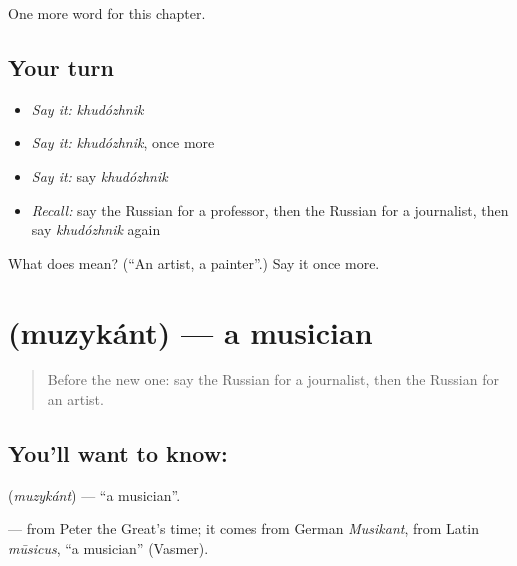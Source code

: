 \begin{grammarlens}[title={What you've built}]
One more word for this chapter.
\end{grammarlens}

\subsection*{Your turn}
\begin{itemize}
\raggedright
  \item \emph{Say it:} \emph{khudózhnik}
  \item \emph{Say it:} \emph{khudózhnik}, once more
  \item \emph{Say it:} say \emph{khudózhnik}
  \item \emph{Recall:} say the Russian for a professor, then the Russian for a journalist, then say \emph{khudózhnik} again
\end{itemize}

\begin{tcolorbox}[breakable,colback=teal!4,colframe=teal!35!black,title={Before you move on}]
What does  mean? (\textquotedblleft{}An artist, a painter\textquotedblright{}.) Say it once more.
\end{tcolorbox}
\section[\texorpdfstring{\ru{музыкант} (muzykánt)}{музыкант (muzykánt)}]{ (muzykánt) — a musician}

\label{lesson:RU-C256-muzykant}



\begin{quote}
Before the new one: say the Russian for a journalist, then the Russian for an artist.
\end{quote}

\subsection*{You'll want to know: }
\textbf{} (\emph{muzykánt}) — \textquotedblleft{}a musician\textquotedblright{}.

\begin{cousinweb}
\textbf{} — from Peter the Great's time; it comes from German \emph{Musikant}, from Latin \emph{mūsicus}, \textquotedblleft{}a musician\textquotedblright{} (Vasmer).
\end{cousinweb}

